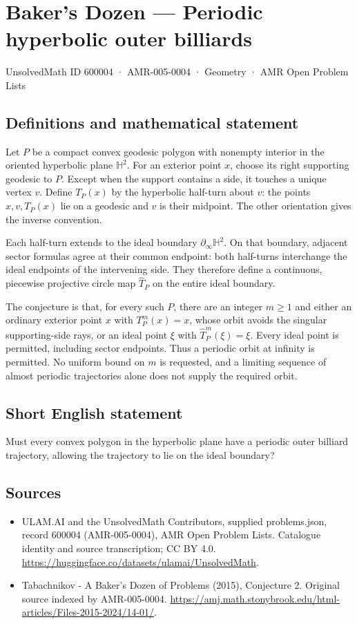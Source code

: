 \documentclass[11pt,a4paper]{article}
\begin{document}
\section*{Baker's Dozen — Periodic hyperbolic outer billiards}\label{600004}
{\small UnsolvedMath ID 600004 · AMR-005-0004 · Geometry · AMR Open Problem Lists}
\subsection{Definitions and mathematical statement}
Let $P$ be a compact convex geodesic polygon with nonempty interior in the
oriented hyperbolic plane $\mathbb H^2$. For an exterior point $x$, choose its
right supporting geodesic to $P$. Except when the support contains a side,
it touches a unique vertex $v$. Define $T_P(x)$ by the hyperbolic half-turn
about $v$: the points $x,v,T_P(x)$ lie on a geodesic and $v$ is their midpoint.
The other orientation gives the inverse convention.

Each half-turn extends to the ideal boundary $\partial_\infty\mathbb H^2$.
On that boundary, adjacent sector formulas agree at their common endpoint:
both half-turns interchange the ideal endpoints of the intervening side.
They therefore define a continuous, piecewise projective circle map
$\widehat T_P$ on the entire ideal boundary.

The conjecture is that, for every such $P$, there are an integer $m\ge1$
and either an ordinary exterior point $x$ with $T_P^m(x)=x$, whose orbit
avoids the singular supporting-side rays, or an ideal point $\xi$ with
$\widehat T_P^m(\xi)=\xi$. Every ideal point is permitted, including sector
endpoints. Thus a periodic orbit at infinity is permitted.
No uniform bound on $m$ is requested, and a limiting sequence of almost
periodic trajectories alone does not supply the required orbit.
\subsection{Short English statement}
Must every convex polygon in the hyperbolic plane have a periodic outer
billiard trajectory, allowing the trajectory to lie on the ideal boundary?
\subsection{Sources}
\begin{itemize}
\item[S1] ULAM.AI and the UnsolvedMath Contributors, supplied problems.json, record 600004 (AMR-005-0004), AMR Open Problem Lists. Catalogue identity and source transcription; CC BY 4.0.
\url{https://huggingface.co/datasets/ulamai/UnsolvedMath}.
\item[S2] Tabachnikov - A Baker's Dozen of Problems (2015), Conjecture 2. Original source indexed by AMR-005-0004.
\url{https://amj.math.stonybrook.edu/html-articles/Files-2015-2024/14-01/}.
\end{itemize}
\end{document}

